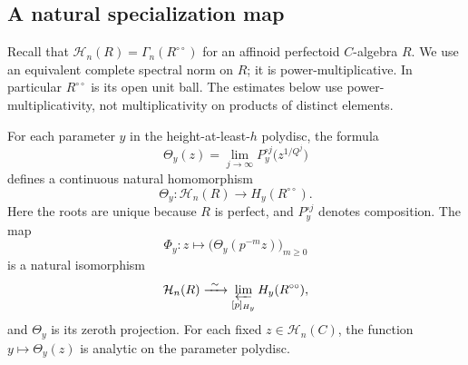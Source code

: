 \subsection{A natural specialization map}

Recall that
$\mathcal H_n(R)=\Gamma_n(R^{\circ\circ})$ for an affinoid perfectoid
$C$-algebra $R$.  We use an equivalent complete spectral norm on $R$;
it is power-multiplicative.  In particular $R^{\circ\circ}$ is its open
unit ball.  The estimates below use power-multiplicativity, not
multiplicativity on products of distinct elements.

\begin{proposition}[Specialization]\label{def:transport}
For each parameter $y$ in the height-at-least-$h$ polydisc, the formula
\begin{equation}
 \Theta_y(z)=\lim_{j\to\infty}
       P_y^{\circ j}\bigl(z^{1/Q^j}\bigr)
 \label{def:theta-limit}
\end{equation}
defines a continuous natural homomorphism
\[
 \Theta_y:\mathcal H_n(R)\longrightarrow H_y(R^{\circ\circ}).
\]
Here the roots are unique because $R$ is perfect, and $P_y^{\circ j}$
denotes composition.  The map
\begin{equation}
 \Phi_y:z\longmapsto
       \bigl(\Theta_y(p^{-m}z)\bigr)_{m\ge0}
 \label{def:cover-identification}
\end{equation}
is a natural isomorphism
\[
 \mathcal H_n(R)\xrightarrow{\ \sim\ }
     \varprojlim_{[p]_{H_y}} H_y(R^{\circ\circ}),
\]
and $\Theta_y$ is its zeroth projection.  For each fixed
$z\in\mathcal H_n(C)$, the function $y\mapsto\Theta_y(z)$ is analytic
on the parameter polydisc.
\end{proposition}

